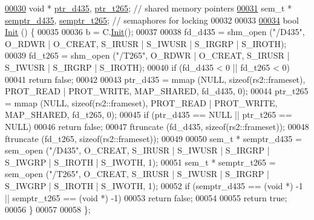 \begin{DoxyCode}
\hypertarget{Cam__Writer_8hpp_source.tex_l00030}{}\hyperlink{classWriter_a032ba2a2ddadb84b74359b9cb073793e}{00030}     \textcolor{keywordtype}{void} * \hyperlink{classWriter_a860ca523e0f6572f5ff5b8ea1dfc9771}{ptr\_d435}, \hyperlink{classWriter_a032ba2a2ddadb84b74359b9cb073793e}{ptr\_t265}; \textcolor{comment}{// shared memory pointers}
\hypertarget{Cam__Writer_8hpp_source.tex_l00031}{}\hyperlink{classWriter_a8858a86e7de822740c0aa52e6386cf58}{00031}     sem\_t * \hyperlink{classWriter_af8ffd0d121f0c5aed20140d69c2f0c45}{semptr\_d435}, \hyperlink{classWriter_a8858a86e7de822740c0aa52e6386cf58}{semptr\_t265}; \textcolor{comment}{// semaphores for locking}
00032 
00033 
\hypertarget{Cam__Writer_8hpp_source.tex_l00034}{}\hyperlink{classWriter_a4193b0f06fb33e260e5eb26ea9356a1c}{00034}     \textcolor{keywordtype}{bool} \hyperlink{classWriter_a4193b0f06fb33e260e5eb26ea9356a1c}{Init} () \{
00035 
00036         b = C.\hyperlink{classCamera_a7f09b843d9b3a97e78eefcebbc53e054}{Init}();
00037 
00038         fd\_d435 = shm\_open (\textcolor{stringliteral}{"/D435"}, O\_RDWR | O\_CREAT, S\_IRUSR | S\_IWUSR | S\_IRGRP | S\_IROTH);
00039         fd\_t265 = shm\_open (\textcolor{stringliteral}{"/T265"}, O\_RDWR | O\_CREAT, S\_IRUSR | S\_IWUSR | S\_IRGRP | S\_IROTH);
00040         \textcolor{keywordflow}{if} (fd\_d435 < 0 || fd\_t265 < 0)
00041             \textcolor{keywordflow}{return} \textcolor{keyword}{false};
00042 
00043         ptr\_d435 = mmap (NULL, \textcolor{keyword}{sizeof}(rs2::frameset), PROT\_READ | PROT\_WRITE, MAP\_SHARED, fd\_d435, 0);
00044         ptr\_t265 = mmap (NULL, \textcolor{keyword}{sizeof}(rs2::frameset), PROT\_READ | PROT\_WRITE, MAP\_SHARED, fd\_t265, 0);
00045         \textcolor{keywordflow}{if} (ptr\_d435 == NULL || ptr\_t265 == NULL)
00046             \textcolor{keywordflow}{return} \textcolor{keyword}{false};
00047         ftruncate (fd\_d435, \textcolor{keyword}{sizeof}(rs2::frameset));
00048         ftruncate (fd\_t265, \textcolor{keyword}{sizeof}(rs2::frameset));
00049 
00050         sem\_t * semptr\_d435 = sem\_open (\textcolor{stringliteral}{"/D435"}, O\_CREAT, S\_IRUSR | S\_IWUSR | S\_IRGRP | S\_IWGRP | S\_IROTH |
       S\_IWOTH, 1);
00051         sem\_t * semptr\_t265 = sem\_open (\textcolor{stringliteral}{"/T265"}, O\_CREAT, S\_IRUSR | S\_IWUSR | S\_IRGRP | S\_IWGRP | S\_IROTH |
       S\_IWOTH, 1);
00052         \textcolor{keywordflow}{if} (semptr\_d435 == (\textcolor{keywordtype}{void} *) -1 || semptr\_t265 == (\textcolor{keywordtype}{void} *) -1)
00053             \textcolor{keywordflow}{return} \textcolor{keyword}{false};
00054 
00055         \textcolor{keywordflow}{return} \textcolor{keyword}{true};
00056     \}
00057     
00058 \};
\end{DoxyCode}
